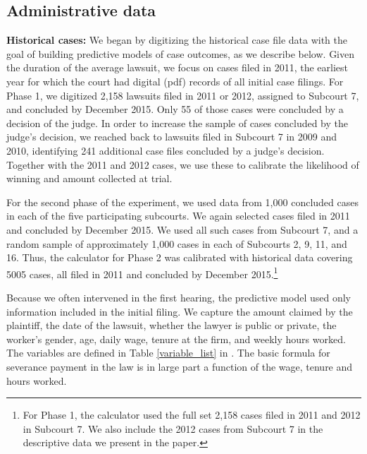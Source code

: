 \documentclass[11pt, a4paper]{article}
\begin{document}
\subsection{Administrative data}

\textbf{Historical cases:} We began by digitizing the historical case file data with the goal of building predictive models of case outcomes, as we describe below. Given the duration of the average lawsuit, we focus on cases filed in 2011, the earliest year for which the court had digital (pdf) records of all initial case filings. For Phase 1, we digitized 2,158 lawsuits filed in 2011 or 2012, assigned to Subcourt 7, and concluded by December 2015. Only 55 of those cases were concluded by a decision of the judge. In order to increase the sample of cases concluded by the judge's decision, we reached back to lawsuits filed in Subcourt 7 in 2009 and 2010, identifying 241 additional case files concluded by a judge's decision. Together with the 2011 and 2012 cases, we use these to calibrate the likelihood of winning and amount collected at trial.

For the second phase of the experiment, we used data from 1,000 concluded cases in each of the five participating subcourts. We again selected cases filed in 2011 and concluded by December 2015. We used all such cases from Subcourt 7, and a random sample of approximately 1,000 cases in each of Subcourts 2, 9, 11, and 16. Thus, the calculator for Phase 2 was calibrated with historical data covering 5005 cases, all filed in 2011 and concluded by December 2015.\footnote{For Phase 1, the calculator used the full set 2,158 cases filed in 2011 and 2012 in Subcourt 7. We also include the 2012 cases from Subcourt 7 in the descriptive data we present in the paper.}

 Because we often intervened in the first hearing, the predictive model used only information included in the initial filing. We capture the amount claimed by the plaintiff, the date of the lawsuit, whether the lawyer is public or private, the worker's gender, age, daily wage, tenure at the firm, and weekly hours worked. The variables are defined in Table \ref{variable_list} in . The basic formula for severance payment in the law is in large part a function of the wage, tenure and hours worked. 
\end{document}
